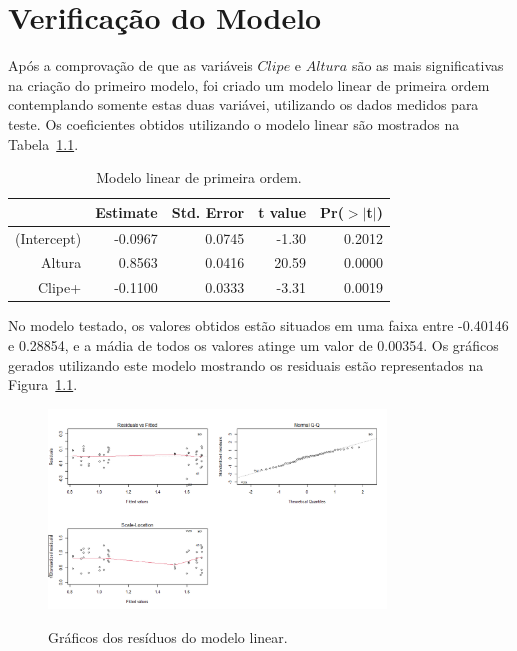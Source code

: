 \chapter{Verificação do Modelo}
\label{chap:verificacao_do_modelo}

Após a comprovação de que as variáveis $Clipe$ e $Altura$ são as mais significativas na criação do primeiro modelo, foi criado um modelo linear de primeira ordem contemplando somente estas duas variávei, utilizando os dados medidos para teste. Os coeficientes obtidos utilizando o modelo linear são mostrados na Tabela~\ref{tab:terc-mod}.

\begin{table}[ht]
    \centering
    \caption{Modelo linear de primeira ordem.}
    \begin{tabular}{rrrrr}
      \hline
     & Estimate & Std. Error & t value & Pr($>$$|$t$|$) \\ 
      \hline
    (Intercept) & -0.0967 & 0.0745 & -1.30 & 0.2012 \\ 
      Altura & 0.8563 & 0.0416 & 20.59 & 0.0000 \\ 
      Clipe+ & -0.1100 & 0.0333 & -3.31 & 0.0019 \\ 
       \hline
    \end{tabular}
    \label{tab:terc-mod}
    \end{table}

No modelo testado, os valores obtidos estão situados em uma faixa entre -0.40146 e 0.28854, e a mádia de todos os valores atinge um valor de 0.00354. Os gráficos gerados utilizando este modelo mostrando os residuais estão representados na Figura~\ref{fig:residuos-plot3}.

\begin{figure}[H]
    \centering
    \caption{Gráficos dos resíduos do modelo linear.}
    \includegraphics[width=0.8\textwidth]{images/model.png}
    \label{fig:residuos-plot3}
  \end{figure}

